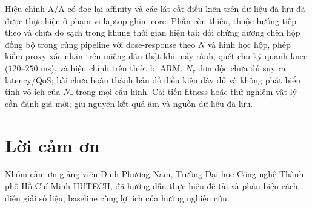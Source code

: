 \documentclass[a4paper,fleqn]{cas-dc}
\newif\ifbranchB
\begin{document}
\ifbranchB
Thực nghiệm detector bổ sung ghi nhận YOLOv13s có mAP person cao nhất trong nhóm nhưng latency lớn, còn YOLO11n có lợi thế tốc độ trong cấu hình đã đo. Kết quả lựa chọn checkpoint rất sớm ở YOLOv13n/s đặt ra nhu cầu đo pretrained mốc 0 và xem lại lịch fine-tuning. Bài vì vậy cung cấp một quy trình và tập bằng chứng để lựa chọn bước nghiên cứu tiếp, chưa tuyên bố phương pháp tấn công vượt các nghiên cứu khác hoặc đã bảo vệ được một hệ thống edge.
\fi
Hiệu chỉnh A/A có đọc lại affinity và các lát cắt điều kiện trên dữ liệu đã lưu đã được thực hiện ở phạm vi laptop ghim core. Phần còn thiếu, thuộc hướng tiếp theo và chưa đo sạch trong khung thời gian hiện tại: đối chứng dương chèn hộp đồng bộ trong cùng pipeline với dose-response theo $N$ và hình học hộp, phép kiểm proxy xác nhận trên miếng dán thật khi máy rảnh, quét chu kỳ quanh knee ($120$--$250$ ms), và hiệu chỉnh trên thiết bị ARM. $N_\tau$ đơn độc chưa đủ suy ra latency/QoS; bài chưa hoàn thành bản đồ điều kiện đầy đủ và không phát biểu tính vô ích của $N_\tau$ trong mọi cấu hình. Cải tiến fitness hoặc thử nghiệm vật lý cần đánh giá mới; giữ nguyên kết quả âm và nguồn dữ liệu đã lưu.

\section*{Lời cảm ơn}

Nhóm cảm ơn giảng viên Đinh Phương Nam, Trường Đại học Công nghệ Thành phố Hồ Chí Minh HUTECH, đã hướng dẫn thực hiện đề tài và phản biện cách diễn giải số liệu, baseline cùng lợi ích của hướng nghiên cứu.
\end{document}
